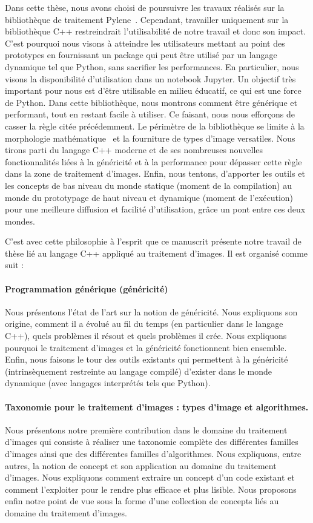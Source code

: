 Dans cette thèse, nous avons choisi de poursuivre les travaux réalisés sur la bibliothèque de traitement
Pylene~\parencite{carlinet.2018.pylene}. Cependant, travailler uniquement sur la bibliothèque C++ restreindrait
l'utilisabilité de notre travail et donc son impact. C'est pourquoi nous visons à atteindre les utilisateurs mettant au
point des prototypes en fournissant un package qui peut être utilisé par un langage dynamique tel que Python, sans
sacrifier les performances. En particulier, nous visons la disponibilité d'utilisation dans un notebook Jupyter. Un
objectif très important pour nous est d'être utilisable en milieu éducatif, ce qui est une force de Python. Dans cette
bibliothèque, nous montrons comment être générique et performant, tout en restant facile à utiliser. Ce faisant, nous
nous efforçons de casser la règle citée précédemment. Le périmètre de la bibliothèque se limite à la morphologie
mathématique~\parencite{najman.2013.mathematical,geraud.2010.book} et la fourniture de types d'image versatiles. Nous
tirons parti du langage C++ moderne et de ses nombreuses nouvelles fonctionnalités liées à la généricité et à la
performance pour dépasser cette règle dans la zone de traitement d'images. Enfin, nous tentons, d'apporter les outils et
les concepts de bas niveau du monde statique (moment de la compilation) au monde du prototypage de haut niveau et
dynamique (moment de l'exécution) pour une meilleure diffusion et facilité d'utilisation, grâce un pont entre ces deux
mondes.

C'est avec cette philosophie à l'esprit que ce manuscrit présente notre travail de thèse lié au langage C++ appliqué au
traitement d'images. Il est organisé comme suit :

\paragraph{Programmation générique (généricité)} Nous présentons l'état de l'art sur la notion de généricité. Nous
expliquons son origine, comment il a évolué au fil du temps (en particulier dans le langage C++), quels problèmes il
résout et quels problèmes il crée. Nous expliquons pourquoi le traitement d'images et la généricité fonctionnent bien
ensemble. Enfin, nous faisons le tour des outils existants qui permettent à la généricité (intrinsèquement restreinte au
langage compilé) d'exister dans le monde dynamique (avec langages interprétés tels que Python).

\paragraph{Taxonomie pour le traitement d'images : types d'image et algorithmes.} Nous présentons notre première
contribution dans le domaine du traitement d'images qui consiste à réaliser une taxonomie complète des différentes
familles d'images ainsi que des différentes familles d'algorithmes. Nous expliquons, entre autres, la notion de concept
et son application au domaine du traitement d'images. Nous expliquons comment extraire un concept d'un code existant et
comment l'exploiter pour le rendre plus efficace et plus lisible. Nous proposons enfin notre point de vue sous la forme
d'une collection de concepts liés au domaine du traitement d'images.

